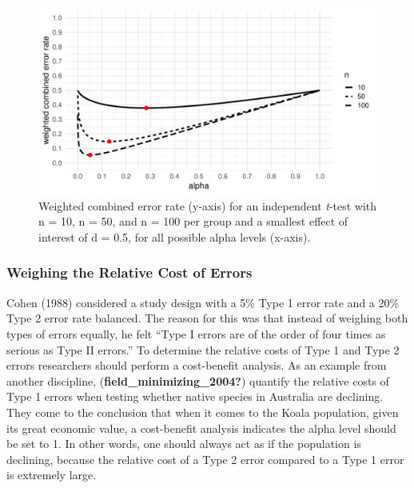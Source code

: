 \documentclass[
  english,
  ,man,floatsintext]{apa6}
\begin{document}
\begin{figure}
\centering
\includegraphics{Justify_in_Practice_files/figure-latex/weight-plot-1.pdf}
\caption{\label{fig:weight-plot}Weighted combined error rate (y-axis) for an independent \emph{t}-test with n = 10, n = 50, and n = 100 per group and a smallest effect of interest of d = 0.5, for all possible alpha levels (x-axis).}
\end{figure}

\hypertarget{weighing-the-relative-cost-of-errors}{%
\subsubsection{Weighing the Relative Cost of Errors}\label{weighing-the-relative-cost-of-errors}}

Cohen (1988) considered a study design with a 5\% Type 1 error rate and a 20\% Type 2 error rate balanced. The reason for this was that instead of weighing both types of errors equally, he felt ``Type I errors are of the order of four times as serious as Type II errors.'' To determine the relative costs of Type 1 and Type 2 errors researchers should perform a cost-benefit analysis. As an example from another discipline, (\textbf{field\_minimizing\_2004?}) quantify the relative costs of Type 1 errors when testing whether native species in Australia are declining. They come to the conclusion that when it comes to the Koala population, given its great economic value, a cost-benefit analysis indicates the alpha level should be set to 1. In other words, one should always act as if the population is declining, because the relative cost of a Type 2 error compared to a Type 1 error is extremely large.
\end{document}
